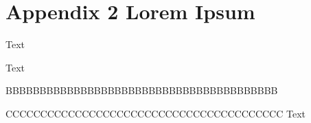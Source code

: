 
%


\chapter{Appendix 2 Lorem Ipsum}
\label{app:lorem_ipsum2}
Text

\begin{newpdflayout}{210mm}{297mm}%

Text

BBBBBBBBBBBBBBBBBBBBBBBBBBBBBBBBBBBBBBBB
\end{newpdflayout}

CCCCCCCCCCCCCCCCCCCCCCCCCCCCCCCCCCCCCCCC
Text
